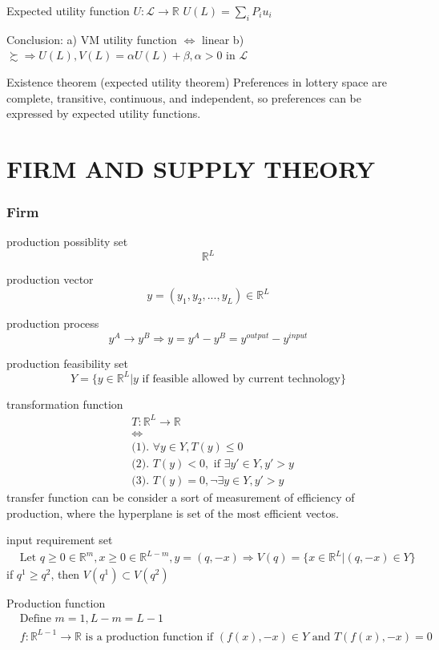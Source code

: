 \documentclass{article}
\begin{document}
Expected utility function
$U:\mathscr{L}\rightarrow \mathbb{R}$
$U(L)=\sum\limits_{i} P_{i}u_{i}$

Conclusion:
a) VM utility function $\iff$ linear
b) $\succsim \Rightarrow U(L), V(L)=\alpha U(L)+\beta,\alpha >0$ in $\mathscr{L}$

Existence theorem (expected utility theorem)
Preferences in lottery space are complete, transitive, continuous, and independent, so preferences can be expressed by expected utility functions.

\newpage
\part{FIRM AND SUPPLY THEORY}


\newpage
\section{Firm}
production possiblity set
$$\mathbb{R}^{L}$$

production vector
$$y=(y_{1}, y_{2},...,y_{L})\in \mathbb{R}^{L}$$

production process
$$y^{A} \rightarrow y^{B} \Rightarrow y=y^{A}-y^{B}=y^{output}-y^{input}$$

production feasibility set
$$Y=\{y\in \mathbb{R}^{L}|y \text{ if feasible allowed by current technology}\}$$

transformation function
\begin{align}
&T: \mathbb{R}^{L} \rightarrow \mathbb{R}
\\&\iff
\\&\text{(1). } \forall y \in Y, T(y) \leqslant 0
\\&\text{(2). }T(y)<0,\text{ if } \exists y'\in Y,y'>y
\\&\text{(3). }T(y)=0, \neg \exists y \in Y, y' >y
\end{align}
transfer function can be consider a sort of measurement of efficiency of production, where the hyperplane is set of the most efficient vectos.

input requirement set
\begin{align}
&\text{Let } q \geqslant 0\in \mathbb{R}^{m}, x \geqslant 0 \in \mathbb{R}^{L-m},y=(q,-x) \Rightarrow V(q)=\{x\in \mathbb{R}^{L}|(q,-x)\in Y\}
\end{align}
if $q^{1}\geqslant q^{2}$, then $V(q^{1}) \subset V(q^{2})$

Production function
\begin{align}
&\text{Define }m=1,L-m=L-1
\\&f:\mathbb{R}^{L-1} \rightarrow \mathbb{R} \text{ is a production function if } (f(x),-x)\in Y \text{ and } T(f(x),-x)=0
\end{align}
\end{document}
